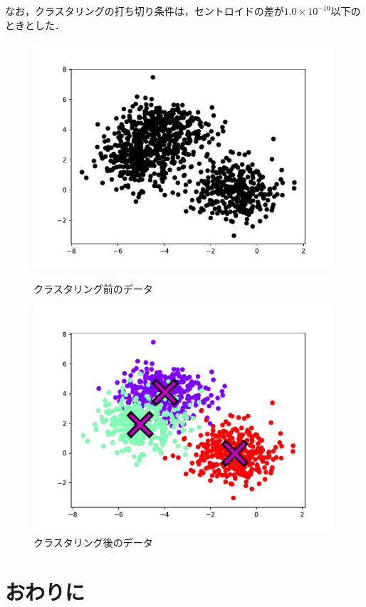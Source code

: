 \documentclass[10pt,a4j,twocolumn]{ltjsarticle}
\begin{document}
なお，クラスタリングの打ち切り条件は，セントロイドの差が$1.0\times10^{-10}$以下のときとした．
\begin{figure}[htbp]
	\begin{center}
		\includegraphics[width=0.8\linewidth]{img/k-means/before.pdf}
		\caption{クラスタリング前のデータ}
		\label{img:kmeans-before}
	\end{center}
	\begin{center}
		\includegraphics[width=0.8\linewidth]{img/k-means/after.pdf}
		\caption{クラスタリング後のデータ}
		\label{img:kmeans-after}
	\end{center}
\end{figure}
\section{おわりに}

\printbibliography[title=参考文献]
\end{document}
